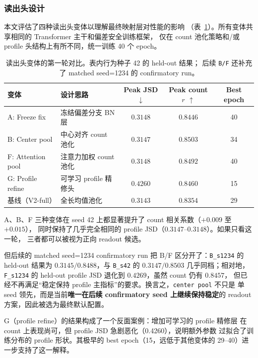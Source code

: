 \documentclass[11pt,a4paper]{ctexart}
\begin{document}
\subsubsection{读出头设计}

本文评估了四种读出头变体以理解最终映射层对性能的影响
（表~\ref{tab:readout}）。所有变体共享相同的 Transformer 主干和偏差安全训练框架，
仅在 count 池化策略和/或 profile 头结构上有所不同，统一训练 40 个 epoch。

\begin{table}[H]
\centering
\caption{读出头变体的第一轮对比。表内行为种子 42 的 held-out 结果；
后续 \texttt{B/F} 还补充了 matched seed=1234 的 confirmatory run。}
\label{tab:readout}
\begin{tabular}{llccc}
\toprule
变体 & 设计思路 & Peak JSD $\downarrow$ & Peak count $r$ $\uparrow$
  & Best epoch \\
\midrule
A: Freeze fix & 冻结偏差分支 BN 层 & $0.3148$ & $0.8446$ & 40 \\
B: Center pool & 中心对齐 count 池化 & $\mathbf{0.3147}$ & $\mathbf{0.8503}$ & 34 \\
F: Attention pool & 注意力加权 count 池化 & $0.3148$ & $0.8492$ & 40 \\
G: Profile refine & 可学习 profile 精修头 & $0.4260$ & $0.8460$ & 15 \\
\midrule
基线（V2-full） & 全长均值池化 & $0.3143$ & $0.8354$ & 29 \\
\bottomrule
\end{tabular}
\end{table}

A、B、F 三种变体在 seed 42 上都显著提升了 count 相关系数（$+0.009$ 至 $+0.015$），
同时保持了几乎完全相同的 profile JSD（$0.3147$--$0.3148$）。如果只看这一轮，
三者都可以被视为正向 readout 候选。

但后续的 matched seed=1234 confirmatory run 把 B/F 区分开了：\texttt{B\_s1234} 的 held-out
结果为 $0.3145 / 0.8488$，与 \texttt{B\_s42} 的 $0.3147 / 0.8503$ 几乎同档；相对地，
\texttt{F\_s1234} 的 held-out profile JSD 退化到 $0.4269$，虽然 count 仍有 $0.8457$，
但已经不再满足“稳定保持 profile 主指标”的要求。换言之，\texttt{center pool} 不只是
单 seed 领先，而是当前\textbf{唯一在后续 confirmatory seed 上继续保持稳定}的
readout 方案，因此被选为最终默认配置。

G（profile refine）的结果构成了一个反面案例：增加可学习的 profile 精修层
在 count 上表现尚可，但 profile JSD 急剧恶化（0.4260），说明额外参数
过拟合了训练分布的 profile 形状。其极早的 best epoch（15，远低于其他变体的
29--40）进一步支持了这一解释。
\end{document}
